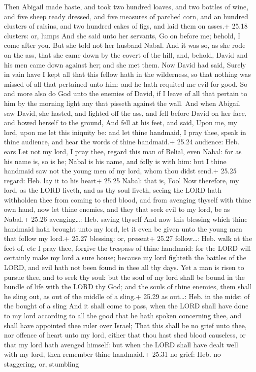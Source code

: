  Then Abigail made haste, and took two hundred loaves,
and two bottles of wine, and five sheep ready dressed, and five measures
of parched corn, and an hundred clusters of raisins, and two hundred
cakes of figs, and laid them on asses.+ 25.18 clusters: or, lumps
 And she said unto her servants, Go on before me; behold, I
come after you. But she told not her husband Nabal.  And it
was so, as she rode on the ass, that she came down by the covert of the
hill, and, behold, David and his men came down against her; and she met
them.  Now David had said, Surely in vain have I kept all
that this fellow hath in the wilderness, so that nothing was missed of
all that pertained unto him: and he hath requited me evil for good.
 So and more also do God unto the enemies of David, if I
leave of all that pertain to him by the morning light any that pisseth
against the wall.  And when Abigail saw David, she hasted,
and lighted off the ass, and fell before David on her face, and bowed
herself to the ground,  And fell at his feet, and said,
Upon me, my lord, upon me let this iniquity be: and let thine handmaid,
I pray thee, speak in thine audience, and hear the words of thine
handmaid.+ 25.24 audience: Heb. ears  Let not my lord, I
pray thee, regard this man of Belial, even Nabal: for as his name is, so
is he; Nabal is his name, and folly is with him: but I thine handmaid
saw not the young men of my lord, whom thou didst send.+ 25.25 regard:
Heb. lay it to his heart+ 25.25 Nabal: that is, Fool  Now
therefore, my lord, as the LORD liveth, and as thy soul liveth, seeing
the LORD hath withholden thee from coming to shed blood, and from
avenging thyself with thine own hand, now let thine enemies, and they
that seek evil to my lord, be as Nabal.+ 25.26 avenging\ldots: Heb.
saving thyself  And now this blessing which thine handmaid
hath brought unto my lord, let it even be given unto the young men that
follow my lord.+ 25.27 blessing: or, present+ 25.27 follow\ldots: Heb.
walk at the feet of, etc  I pray thee, forgive the trespass
of thine handmaid: for the LORD will certainly make my lord a sure
house; because my lord fighteth the battles of the LORD, and evil hath
not been found in thee all thy days.  Yet a man is risen to
pursue thee, and to seek thy soul: but the soul of my lord shall be
bound in the bundle of life with the LORD thy God; and the souls of
thine enemies, them shall he sling out, as out of the middle of a
sling.+ 25.29 as out\ldots: Heb. in the midst of the bought of a sling
 And it shall come to pass, when the LORD shall have done
to my lord according to all the good that he hath spoken concerning
thee, and shall have appointed thee ruler over Israel; 
That this shall be no grief unto thee, nor offence of heart unto my
lord, either that thou hast shed blood causeless, or that my lord hath
avenged himself: but when the LORD shall have dealt well with my lord,
then remember thine handmaid.+ 25.31 no grief: Heb. no staggering, or,
stumbling

